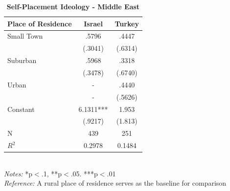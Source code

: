 \documentclass[12pt, titlepage]{article}
\newcommand\e{\emph}
\newcommand\tb{\textbf}
\begin{document}
\begin{singlespace}
	\begin{table}[H]
		\centering
		\caption{\tb{Self-Placement Ideology - Middle East}}
		\begin{tabulary}{\linewidth}{l c c}

			\hline
			\tb{Place of Residence}&\tb{Israel} & \tb{Turkey} \\
			\hline
			Small Town&.5796 & .4447 \\
			&(.3041)  & (.6314)\\
			Suburban&.5968 &.3318 \\
			& (.3478)  & (.6740)\\
			Urban &- & .4440\\
			&- & (.5626)\\
			Constant& 6.1311*** &1.953 \\
			& (.9217)  & (1.813)\\
			N&439 & 251\\
			$R^2$&0.2978 & 0.1484 \\
			\hline 
		\end{tabulary}
		\\
		\e{Notes:} *p$<$.1, **p$<$.05. ***p$<$.01 \\
		\e{Reference:} A rural place of residence serves as the baseline for comparison
		\label{table10}
	\end{table}
\end{singlespace}
\end{document}
